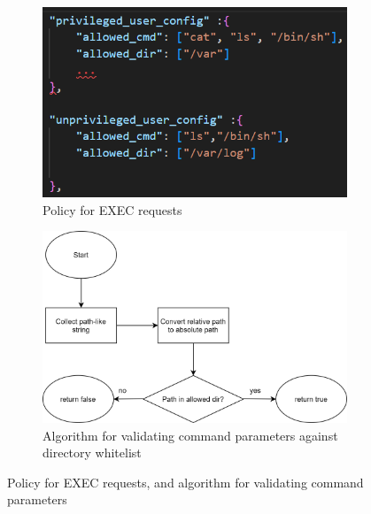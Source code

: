 \begin{figure}[!htb] 
    \begin{subfigure}[b]{0.3\linewidth}
      \centering
      \includegraphics[width=0.9\linewidth]{images/exec_policy.png} 
      \caption{Policy for EXEC requests} 
      \label{fig:exec_policy} 
      \vspace{4ex}
    \end{subfigure}%
    \begin{subfigure}[b]{0.6\linewidth}
      \centering
      \includegraphics[width=0.9\linewidth]{images/algo_for_path_checking.png} 
      \caption{Algorithm for validating command parameters against directory whitelist} 
      \label{fig:algo_for_path_checking} 
      \vspace{4ex}
    \end{subfigure} 
    \caption{Policy for EXEC requests, and algorithm for validating command parameters}
    \label{fig3} 
\end{figure}


